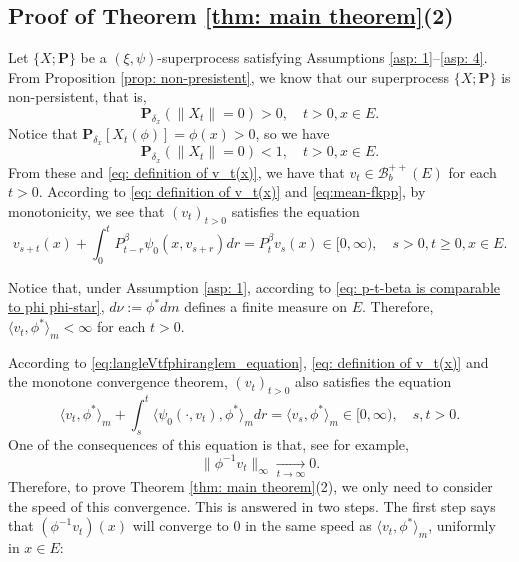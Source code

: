 \documentclass[12pt, a4paper]{amsart}
\theoremstyle{definition}
\numberwithin{equation}{section}
\begin{document}
\subsection{Proof of Theorem \ref{thm: main theorem}(2)}
\label{sec: proof of result 2}
	Let $\{X; \mathbf P\}$ be a $(\xi, \psi)$-superprocess satisfying
	Assumptions \ref{asp: 1}--\ref{asp: 4}.
	From Proposition \ref{prop: non-presistent}, we know that our superprocess $\{X;\mathbf P\}$ is non-persistent, that is, 
\begin{equation}
    \mathbf P_{\delta_x}(\|X_t\| = 0)
    > 0,
    \quad t>0, x \in E.
\end{equation}
	Notice that $\mathbf P_{\delta_x}[X_t(\phi)] = \phi(x)>0$, so we have
\begin{equation}
    \mathbf P_{\delta_x}(\|X_t\|= 0)<1,
    \quad t>0, x \in E.
\end{equation}
	From these and \eqref{eq: definition of v_t(x)}, we have that $v_t \in \mathscr B^{++}_b(E)$ for each $t > 0$.
	According to \eqref{eq: definition of v_t(x)} and \eqref{eq:mean-fkpp}, by monotonicity, 
	we see that $(v_t)_{t > 0}$ satisfies the equation
\begin{equation}
	v_{s+t}(x) + \int_0^t P^\beta_{t-r} \psi_0(x,v_{s+r}) dr
	= P^\beta_t v_s(x)
	\in [0,\infty),
	\quad s>0, t \geq 0,x \in E.
\end{equation}

	Notice that, under Assumption \ref{asp: 1}, according to \eqref{eq: p-t-beta is comparable to phi phi-star}, $d\nu:= \phi^* dm$ defines a finite measure on $E$.
	Therefore, $\langle v_t, \phi^*\rangle_m < \infty$ for each $t>0$.

	According to \eqref{eq:langleVtfphiranglem_equation}, \eqref{eq: definition of v_t(x)} and the monotone convergence theorem, 
	$(v_t)_{t> 0}$ also satisfies the equation
\begin{equation} \label{eq: equation of <vt,phi>}
	\langle v_t,\phi^*\rangle_m + \int_s^t \langle \psi_0(\cdot ,v_t) , \phi^*\rangle_m dr
	= \langle v_s,\phi^*\rangle_m
	\in [0,\infty),
	\quad s, t > 0.
\end{equation}
	One of the consequences of this equation is that, see \cite[Lemma 5.1]{RenSongSun2017Spine} for example,
\begin{equation} \label{eq: uniform converges to 0}
    \|\phi^{-1}v_t\|_{\infty} \xrightarrow[t\to \infty]{} 0.
\end{equation}
	Therefore, to prove Theorem \ref{thm: main theorem}(2), we only need to consider the speed of this convergence.
	This is answered in two steps.
	The first step says that $(\phi^{-1}v_t)(x)$ will converge to $0$ in the same speed as $\langle v_t,\phi^*\rangle_m $, uniformly in $x\in E$:
\end{document}
